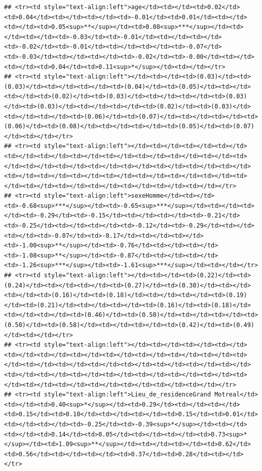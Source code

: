 \documentclass[
]{article}
\begin{document}
\begin{verbatim}
## <tr><td style="text-align:left">age</td><td></td><td>0.02</td><td>0.04</td><td></td><td></td><td>-0.01</td><td>0.01</td><td></td><td></td><td>0.05<sup>**</sup></td><td>0.08<sup>***</sup></td><td></td><td></td><td>-0.03</td><td>-0.01</td><td></td><td></td><td>-0.02</td><td>-0.01</td><td></td><td></td><td>-0.07</td><td>-0.03</td><td></td><td></td><td>-0.02</td><td>-0.00</td><td></td><td></td><td>0.04</td><td>0.11<sup>*</sup></td><td></td></tr>
## <tr><td style="text-align:left"></td><td></td><td>(0.03)</td><td>(0.03)</td><td></td><td></td><td>(0.04)</td><td>(0.05)</td><td></td><td></td><td>(0.02)</td><td>(0.03)</td><td></td><td></td><td>(0.03)</td><td>(0.03)</td><td></td><td></td><td>(0.02)</td><td>(0.03)</td><td></td><td></td><td>(0.06)</td><td>(0.07)</td><td></td><td></td><td>(0.06)</td><td>(0.08)</td><td></td><td></td><td>(0.05)</td><td>(0.07)</td><td></td></tr>
## <tr><td style="text-align:left"></td><td></td><td></td><td></td><td></td><td></td><td></td><td></td><td></td><td></td><td></td><td></td><td></td><td></td><td></td><td></td><td></td><td></td><td></td><td></td><td></td><td></td><td></td><td></td><td></td><td></td><td></td><td></td><td></td><td></td><td></td><td></td><td></td></tr>
## <tr><td style="text-align:left">sexeHomme</td><td></td><td>-0.68<sup>***</sup></td><td>-0.65<sup>***</sup></td><td></td><td></td><td>-0.29</td><td>-0.15</td><td></td><td></td><td>-0.21</td><td>-0.25</td><td></td><td></td><td>-0.12</td><td>-0.29</td><td></td><td></td><td>-0.07</td><td>-0.17</td><td></td><td></td><td>-1.00<sup>**</sup></td><td>-0.76</td><td></td><td></td><td>-1.08<sup>**</sup></td><td>-0.87</td><td></td><td></td><td>-1.26<sup>***</sup></td><td>-1.61<sup>***</sup></td><td></td></tr>
## <tr><td style="text-align:left"></td><td></td><td>(0.22)</td><td>(0.24)</td><td></td><td></td><td>(0.27)</td><td>(0.30)</td><td></td><td></td><td>(0.16)</td><td>(0.18)</td><td></td><td></td><td>(0.19)</td><td>(0.21)</td><td></td><td></td><td>(0.16)</td><td>(0.18)</td><td></td><td></td><td>(0.46)</td><td>(0.50)</td><td></td><td></td><td>(0.50)</td><td>(0.58)</td><td></td><td></td><td>(0.42)</td><td>(0.49)</td><td></td></tr>
## <tr><td style="text-align:left"></td><td></td><td></td><td></td><td></td><td></td><td></td><td></td><td></td><td></td><td></td><td></td><td></td><td></td><td></td><td></td><td></td><td></td><td></td><td></td><td></td><td></td><td></td><td></td><td></td><td></td><td></td><td></td><td></td><td></td><td></td><td></td><td></td></tr>
## <tr><td style="text-align:left">Lieu_de_residenceGrand Motreal</td><td></td><td>0.40<sup>*</sup></td><td>0.29</td><td></td><td></td><td>0.15</td><td>0.10</td><td></td><td></td><td>0.15</td><td>0.01</td><td></td><td></td><td>-0.25</td><td>-0.39<sup>*</sup></td><td></td><td></td><td>0.14</td><td>0.05</td><td></td><td></td><td>0.73<sup>*</sup></td><td>1.09<sup>**</sup></td><td></td><td></td><td>0.62</td><td>0.56</td><td></td><td></td><td>0.37</td><td>0.28</td><td></td></tr>

\end{verbatim}
\end{document}
